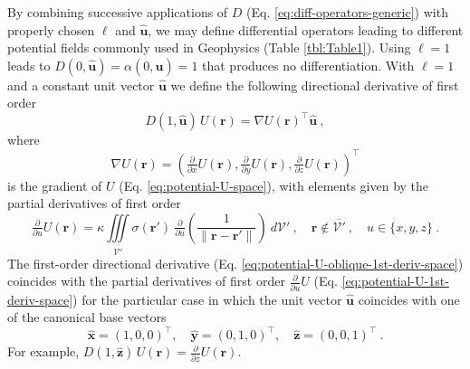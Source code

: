 By combining successive applications of $D$ 
(Eq. \ref{eq:diff-operators-generic}) with properly chosen $\ell$ and $\hat{\mathbf{u}}$, 
we may define differential operators leading to different potential fields commonly used 
in Geophysics (Table \ref{tbl:Table1}).
Using $\ell = 1$ leads to $D(0, \hat{\mathbf{u}}) = \alpha(0, \hat{\mathbf{u}}) = 1$ that produces 
no differentiation.
With $\ell = 1$ and a constant unit vector $\hat{\mathbf{u}}$ we define the following
directional derivative of first order
\begin{equation}
	D(1, \hat{\mathbf{u}}) \, U(\mathbf{r}) = \nabla U(\mathbf{r})^{\top} \hat{\mathbf{u}} \: ,
	\label{eq:potential-U-oblique-1st-deriv-space}
\end{equation}
where
\begin{equation}
	\nabla U(\mathbf{r}) = \left( 
	\tfrac{\partial}{\partial x} U(\mathbf{r}),
	\tfrac{\partial}{\partial y} U(\mathbf{r}),
	\tfrac{\partial}{\partial z} U(\mathbf{r}) \right)^{\top}
	\label{eq:potential-U-grad-space}
\end{equation}
is the gradient of $U$ (Eq. \ref{eq:potential-U-space}), with elements
given by the partial derivatives of first order
\begin{equation}
	\tfrac{\partial}{\partial u} U(\mathbf{r}) = \kappa \iiint\limits_{\overline{\mathcal{V}'}}
	\sigma(\mathbf{r}') \: 
	\tfrac{\partial}{\partial u} \left( \frac{1}{\| \mathbf{r} - \mathbf{r}'\|} \right)
	\: d\mathcal{V}' \: , 
	\quad \mathbf{r} \notin \overline{\mathcal{V}'} \: , \quad u \in \{ x, y, z \} \: .
	\label{eq:potential-U-1st-deriv-space}
\end{equation}
The first-order directional derivative (Eq. \ref{eq:potential-U-oblique-1st-deriv-space})
coincides with the partial derivatives of first order $\tfrac{\partial}{\partial u} U$ (Eq. \ref{eq:potential-U-1st-deriv-space})
for the particular case in which the unit vector $\hat{\mathbf{u}}$ coincides with one of the canonical base vectors
\begin{equation}
	\hat{\mathbf{x}} = (1,0,0)^{\top} , \quad 
	\hat{\mathbf{y}} = (0,1,0)^{\top} , \quad
	\hat{\mathbf{z}} = (0,0,1)^{\top} \: .
	\label{eq:canonical-base-vector}
\end{equation}
For example, $D(1, \hat{\mathbf{z}}) \, U(\mathbf{r}) = \tfrac{\partial}{\partial z} U(\mathbf{r})$.

